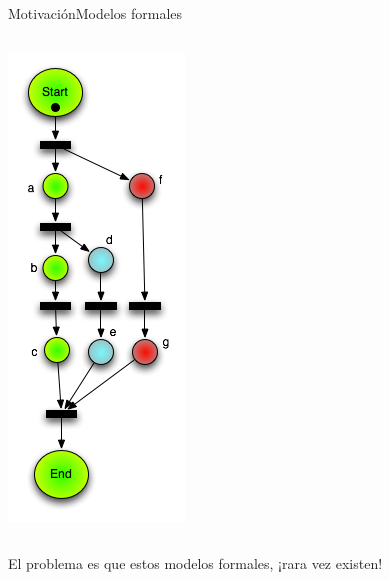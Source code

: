 \documentclass[spanish,pdf]{beamer}
\begin{document}
\begin{frame}{Motivación}{Modelos formales}
\begin{columns}
\begin{minipage}[c][0.3\textheight][c]{\linewidth}
      \end{minipage}
      \begin{minipage}[c][0.05\textheight][c]{\linewidth}
        \centering
        \includegraphics[width=0.5\linewidth]{img/ejemplo3.png}
      \end{minipage}
  \end{columns}
  \vspace*{-0.5cm}
  \pause 
  \begin{minipage}[c][0.4\textheight][c]{\linewidth}
    El problema es que estos modelos formales, ¡rara vez existen!
  \end{minipage}
\end{frame}
\end{document}
